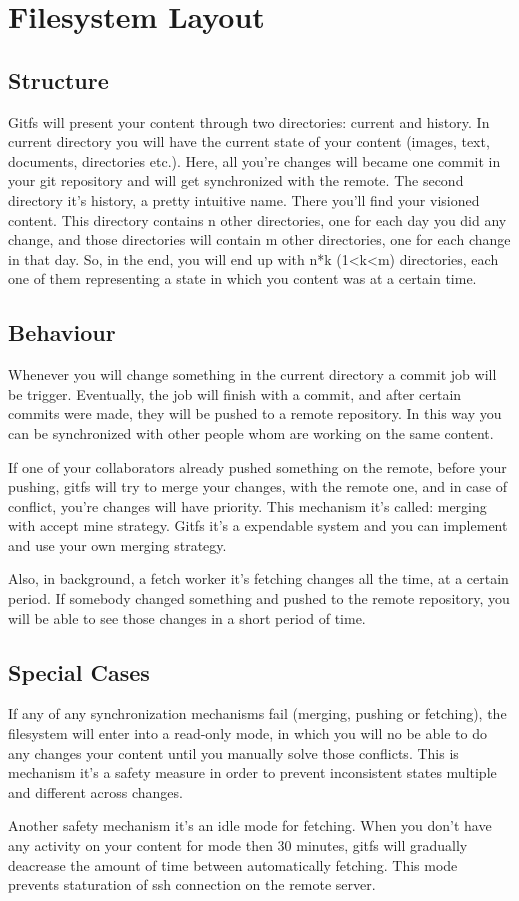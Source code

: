 \chapter{Filesystem Layout}

\label{ch:fslayout}

\section{Structure}

Gitfs will present your content through two directories: current and history. In current directory you will have the current state of your content (images, text, documents, directories etc.). Here, all you're changes will became one commit in your git repository and will get synchronized with the remote. The second directory it's history, a pretty intuitive name. There you'll find your visioned content. This directory contains n other directories, one for each day you did any change, and those directories will contain m other directories, one for each change in that day. So, in the end, you will end up with n*k (1<k<m) directories, each one of them representing a state in which you content was at a certain time.

\section{Behaviour}

Whenever you will change something in the current directory a commit job will be trigger. Eventually, the job will finish with a commit, and after certain commits were made, they will be pushed to a remote repository. In this way you can be synchronized  with other people whom are working on the same content.

If one of your collaborators already pushed something on the remote, before your pushing, gitfs will try to merge your changes, with the remote one, and in case of conflict, you're changes will have priority. This mechanism it's called: merging with accept mine strategy. Gitfs it's a expendable system and you can implement and use your own merging strategy.

Also, in background, a fetch worker it's fetching changes all the time, at a certain period. If somebody changed something and pushed to the remote repository, you will be able to see those changes in a short period of time.

\section{Special Cases}
If any of any synchronization mechanisms fail (merging, pushing or fetching), the filesystem will enter into a read-only mode, in which you will no be able to do any changes your content until you manually solve those conflicts. This is mechanism it's a safety measure in order to prevent inconsistent states multiple and different across changes.

Another safety mechanism it's an idle mode for fetching. When you don't have any activity on your content for mode then 30 minutes, gitfs will gradually deacrease the amount of time between automatically fetching. This mode prevents staturation of ssh connection on the remote server. 